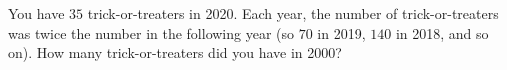 You have $35$ trick-or-treaters in 2020. Each year, the number of trick-or-treaters was twice the number in the following year (so $70$ in 2019, $140$ in 2018, and so on). How many trick-or-treaters did you have in 2000?
